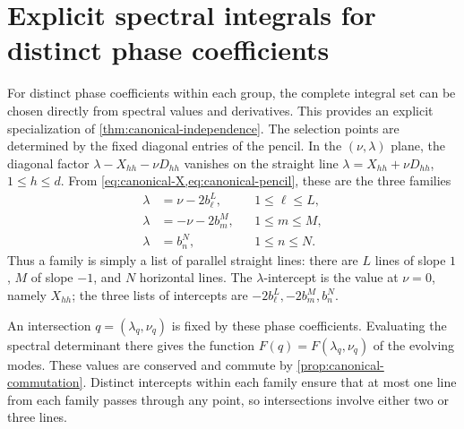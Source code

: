 \section{Explicit spectral integrals for distinct phase coefficients}
\label{sec:distinct-phase-integrals}

For distinct phase coefficients within each group, the complete integral
set can be chosen directly from spectral values and derivatives. This
provides an explicit specialization of \cref{thm:canonical-independence}.
The selection points are determined by
the fixed diagonal entries of the pencil. In the $(\nu,\lambda)$
plane, the diagonal factor $\lambda-X_{hh}-\nu D_{hh}$ vanishes
on the straight line $\lambda=X_{hh}+\nu D_{hh}$,
$1\leq h\leq d$. From \cref{eq:canonical-X,eq:canonical-pencil},
these are the three families
\begin{equation}\label{eq:canonical-diagonal-lines}
\begin{aligned}
 \lambda&=\nu-2b_\ell^L,&&1\leq\ell\leq L,\\
 \lambda&=-\nu-2b_m^M,&&1\leq m\leq M,\\
 \lambda&=b_n^N,&&1\leq n\leq N.
\end{aligned}
\end{equation}
Thus a family is simply a list of parallel straight lines: there are
$L$ lines of slope $1$, $M$ of slope $-1$, and $N$ horizontal lines.
The $\lambda$-intercept is the value at $\nu=0$, namely $X_{hh}$;
the three lists of intercepts are $-2b_\ell^L,-2b_m^M,b_n^N$.

An intersection $q=(\lambda_q,\nu_q)$ is fixed by these phase
coefficients. Evaluating the spectral determinant there gives the
function $F(q)=F(\lambda_q,\nu_q)$ of the evolving modes.
These values are conserved and commute by
\cref{prop:canonical-commutation}. Distinct intercepts within each
family ensure that at most one line from each family passes through
any point, so intersections involve either two or three lines.

